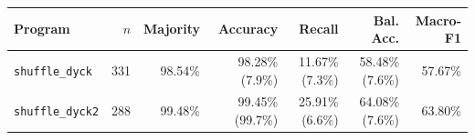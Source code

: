 \begin{tabular}{lrrrrrr}
\toprule
Program & $n$ & Majority & Accuracy & Recall & Bal. Acc. & Macro-F1 \\
\midrule
\texttt{shuffle\_dyck} & 331 & 98.54\% & 98.28\% (7.9\%) & 11.67\% (7.3\%) & 58.48\% (7.6\%) & 57.67\% \\
\texttt{shuffle\_dyck2} & 288 & 99.48\% & 99.45\% (99.7\%) & 25.91\% (6.6\%) & 64.08\% (7.6\%) & 63.80\% \\
\bottomrule
\end{tabular}
